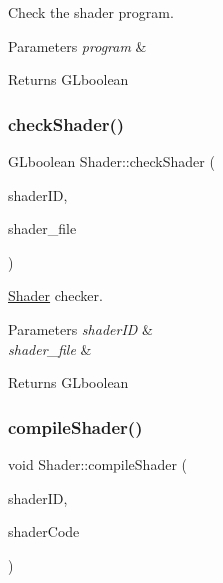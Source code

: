 Check the shader program. 


\begin{DoxyParams}{Parameters}
{\em program} & \\
\hline
\end{DoxyParams}
\begin{DoxyReturn}{Returns}
G\+Lboolean 
\end{DoxyReturn}
\mbox{\label{classShader_abde0c096ccae8bd72639e6203239d0a5}} 
\subsubsection{\texorpdfstring{checkShader()}{checkShader()}}
{\footnotesize\ttfamily G\+Lboolean Shader\+::check\+Shader (\begin{DoxyParamCaption}\item[{G\+Luint}]{shader\+ID,  }\item[{string}]{shader\+\_\+file }\end{DoxyParamCaption})\hspace{0.3cm}{\ttfamily [protected]}}



\mbox{\hyperlink{classShader}{Shader}} checker. 


\begin{DoxyParams}{Parameters}
{\em shader\+ID} & \\
\hline
{\em shader\+\_\+file} & \\
\hline
\end{DoxyParams}
\begin{DoxyReturn}{Returns}
G\+Lboolean 
\end{DoxyReturn}
\mbox{\label{classShader_a69ca69aecbaa3dc7a84a00e80af786fe}} 
\subsubsection{\texorpdfstring{compileShader()}{compileShader()}}
{\footnotesize\ttfamily void Shader\+::compile\+Shader (\begin{DoxyParamCaption}\item[{G\+Luint}]{shader\+ID,  }\item[{string}]{shader\+Code }\end{DoxyParamCaption})\hspace{0.3cm}{\ttfamily [protected]}}



